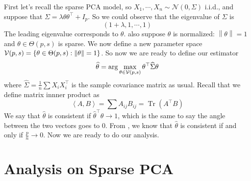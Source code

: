 \documentclass[12pt]{article}
\newcommand{\lam}{\lambda}
\DeclareMathOperator{\Tr}{Tr}
\newcommand{\calV}{{\cal V}}
\newcommand{\innprod}[1]{\left\langle#1\right\rangle}
\newcommand{\norm}[1]{\left\|#1\right\|}
\newcommand{\wh}[1]{\widehat{#1}}
\def\beq{\begin{equation}}
\def\eeq{\end{equation}}
\begin{document}
	\MakeScribeTop

First let's recall the sparse PCA model, so $X_1,\cdots,X_n\sim \mathcal{N}(0,\Sigma)$ i.i.d., and suppose that $\Sigma=\lambda\theta\theta^\top +I_p$. So we could observe that the eigenvalue of $\Sigma$ is
\beq
(1+\lam, 1,\cdots,1)
\eeq
The leading eigenvalue corresponds to $\theta$.
 also suppose $\theta$ is normalized: $\norm{\theta}=1$ and $\theta\in\Theta(p,s)$ is sparse. We now define a new parameter space $\calV(p,s)=\left\{\theta\in\Theta(p,s): \norm{\theta}=1\right\}$. So now we are ready to define our estimator
\begin{equation}\label{eq:estimator}
\wh{\theta}=\arg\max_{\theta\in\calV(p,s)} \theta^\top\wh{\Sigma}\theta
\end{equation}
where $\wh{\Sigma}=\frac{1}{n}\sum X_iX_i^\top$ is the sample covariance matrix as usual. Recall that we define matrix innner product as
\begin{equation}
\innprod{A,B}=\sum A_{ij}B_{ij}=\Tr(A^\top B)
\end{equation}
We say that $\wh{\theta}$ is consistent if $\wh{\theta}^\top\theta\rightarrow 1$, which is the same to say the angle between the two vectors goes to $0$. From \cite{doi:10.1198/jasa.2009.0121}, we know that $\wh{\theta}$ is consistent if and only if $\frac{p}{n}\rightarrow 0$.
Now we are ready to do our analysis.
\section{Analysis on Sparse PCA}
\end{document}
